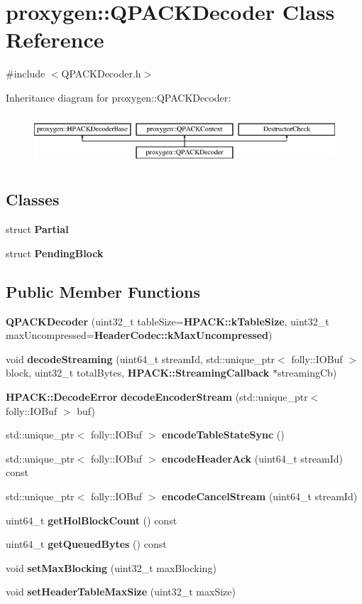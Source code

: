 \section{proxygen\+:\+:Q\+P\+A\+C\+K\+Decoder Class Reference}
\label{classproxygen_1_1QPACKDecoder}


{\ttfamily \#include $<$Q\+P\+A\+C\+K\+Decoder.\+h$>$}

Inheritance diagram for proxygen\+:\+:Q\+P\+A\+C\+K\+Decoder\+:\begin{figure}[H]
\begin{center}
\leavevmode
\includegraphics[height=1.876047cm]{classproxygen_1_1QPACKDecoder}
\end{center}
\end{figure}
\subsection*{Classes}
\begin{DoxyCompactItemize}
\item 
struct {\bf Partial}
\item 
struct {\bf Pending\+Block}
\end{DoxyCompactItemize}
\subsection*{Public Member Functions}
\begin{DoxyCompactItemize}
\item 
{\bf Q\+P\+A\+C\+K\+Decoder} (uint32\+\_\+t table\+Size={\bf H\+P\+A\+C\+K\+::k\+Table\+Size}, uint32\+\_\+t max\+Uncompressed={\bf Header\+Codec\+::k\+Max\+Uncompressed})
\item 
void {\bf decode\+Streaming} (uint64\+\_\+t stream\+Id, std\+::unique\+\_\+ptr$<$ folly\+::\+I\+O\+Buf $>$ block, uint32\+\_\+t total\+Bytes, {\bf H\+P\+A\+C\+K\+::\+Streaming\+Callback} $\ast$streaming\+Cb)
\item 
{\bf H\+P\+A\+C\+K\+::\+Decode\+Error} {\bf decode\+Encoder\+Stream} (std\+::unique\+\_\+ptr$<$ folly\+::\+I\+O\+Buf $>$ buf)
\item 
std\+::unique\+\_\+ptr$<$ folly\+::\+I\+O\+Buf $>$ {\bf encode\+Table\+State\+Sync} ()
\item 
std\+::unique\+\_\+ptr$<$ folly\+::\+I\+O\+Buf $>$ {\bf encode\+Header\+Ack} (uint64\+\_\+t stream\+Id) const 
\item 
std\+::unique\+\_\+ptr$<$ folly\+::\+I\+O\+Buf $>$ {\bf encode\+Cancel\+Stream} (uint64\+\_\+t stream\+Id)
\item 
uint64\+\_\+t {\bf get\+Hol\+Block\+Count} () const 
\item 
uint64\+\_\+t {\bf get\+Queued\+Bytes} () const 
\item 
void {\bf set\+Max\+Blocking} (uint32\+\_\+t max\+Blocking)
\item 
void {\bf set\+Header\+Table\+Max\+Size} (uint32\+\_\+t max\+Size)
\end{DoxyCompactItemize}
